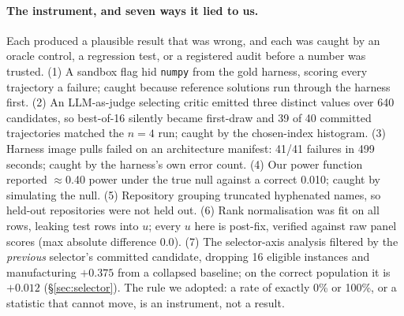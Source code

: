 \documentclass[10pt]{article}
\begin{document}
\paragraph{The instrument, and seven ways it lied to us.}\label{sec:instrument}
Each produced a plausible result that was wrong, and each was caught by an oracle control, a regression test, or a registered audit before a number was trusted. (1) A sandbox flag hid \texttt{numpy} from the gold harness, scoring every trajectory a failure; caught because reference solutions run through the harness first. (2) An LLM-as-judge selecting critic emitted three distinct values over 640 candidates, so best-of-16 silently became first-draw and 39 of 40 committed trajectories matched the $n{=}4$ run; caught by the chosen-index histogram. (3) Harness image pulls failed on an architecture manifest: 41/41 failures in 499 seconds; caught by the harness's own error count. (4) Our power function reported $\approx$0.40 power under the true null against a correct 0.010; caught by simulating the null. (5) Repository grouping truncated hyphenated names, so held-out repositories were not held out. (6) Rank normalisation was fit on all rows, leaking test rows into $u$; every $u$ here is post-fix, verified against raw panel scores (max absolute difference $0.0$). (7) The selector-axis analysis filtered by the \emph{previous} selector's committed candidate, dropping 16 eligible instances and manufacturing $+0.375$ from a collapsed baseline; on the correct population it is $+0.012$ (\S\ref{sec:selector}). The rule we adopted: a rate of exactly 0\% or 100\%, or a statistic that cannot move, is an instrument, not a result.
\end{document}
